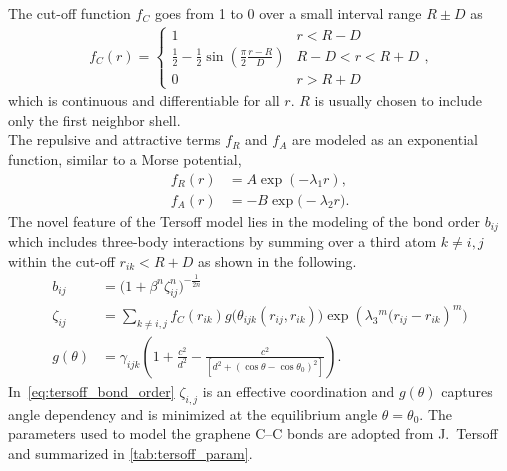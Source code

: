 The cut-off function $f_C$ goes from 1 to 0 over a small interval range $R \pm
D$ as
\begin{align*}
  f_C(r) =
  \begin{cases}
    1 & r < R - D \\
    \frac{1}{2} - \frac{1}{2} \sin{(\frac{\pi}{2} \frac{r - R}{D})} & R - D < r < R + D\\
    0 & r > R + D
  \end{cases},
\end{align*}
which is continuous and differentiable for all $r$. $R$ is usually chosen to
include only the first neighbor shell. \\
The repulsive and attractive terms $f_R$ and $f_A$ are modeled as an exponential
function, similar to a Morse potential, 
\begin{align*}
 f_R(r) &= A \exp(-\lambda_1 r), \\
 f_A(r) &= -B \exp \big(-\lambda_2 r\big).
\end{align*}
The novel feature of the Tersoff model lies in the modeling of the bond order
$b_{ij}$ which includes three-body interactions by summing over a third atom $k
\ne i,j$ within the cut-off $r_{ik} < R + D$ as shown in the following.
\begin{align}
  b_{i j} & =\big(1+\beta^n \zeta_{i j}^n\big)^{-\frac{1}{2 n}} \\
  \zeta_{i j} & =\sum_{k \ne i,j} f_C(r_{i k}) g\Big(\theta_{i j k}\left(r_{i j}, r_{i k}\right)\Big) \exp \left(\lambda_3{ }^m\big(r_{i j}-r_{i k}\right)^m\big) \\
  g(\theta) & =\gamma_{i j k}\left(1+\frac{c^2}{d^2}-\frac{c^2}{\left[d^2+\left(\cos \theta-\cos \theta_0\right)^2\right]}\right).
  \label{eq:tersoff_bond_order}
\end{align}
In~\cref{eq:tersoff_bond_order} $\zeta_{i,j}$ is an effective coordination and
$g(\theta)$ captures angle dependency and is minimized at the equilibrium
angle $\theta = \theta_0$. The parameters used to model the graphene C--C bonds
are adopted from J.\ Tersoff~\cite{PhysRevB.39.5566} and summarized in
\cref{tab:tersoff_param}.

